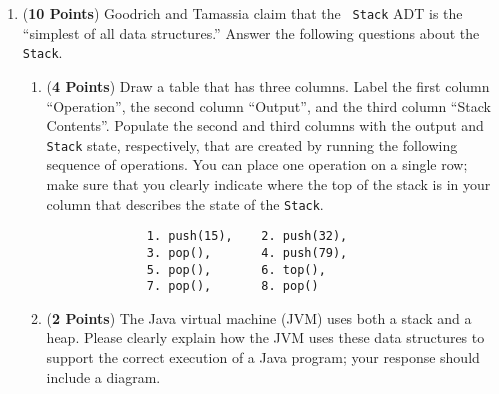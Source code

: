 \documentclass[12pt]{article}
\begin{document}
\begin{enumerate}
        \newpage

      \item ({\bf 10 Points}) Goodrich and Tamassia claim that the {\tt
          Stack} ADT is the ``simplest of all data structures.''  Answer the
        following questions about the {\tt Stack}.

        \begin{enumerate}

          \item ({\bf 4 Points}) Draw a table that has three columns.  Label the first column ``Operation'', the second
            column ``Output'', and the third column ``Stack Contents''.  Populate the second and third columns with the
            output and {\tt Stack} state, respectively, that are created by running the following sequence of
            operations.  You can place one operation on a single row; make sure that you clearly indicate where the top
            of the stack is in your column that describes the state of the {\tt Stack}.

            \begin{verbatim} 
              1. push(15),    2. push(32), 
              3. pop(),       4. push(79),
              5. pop(),       6. top(), 
              7. pop(),       8. pop() 
            \end{verbatim}

            \vspace*{-.3in}

          \item ({\bf 2 Points}) The Java virtual machine (JVM) uses both a stack and a heap.  Please clearly explain
            how the JVM uses these data structures to support the correct execution of a Java program; your response
            should include a diagram.




\end{enumerate}
\end{enumerate}
\end{document}
